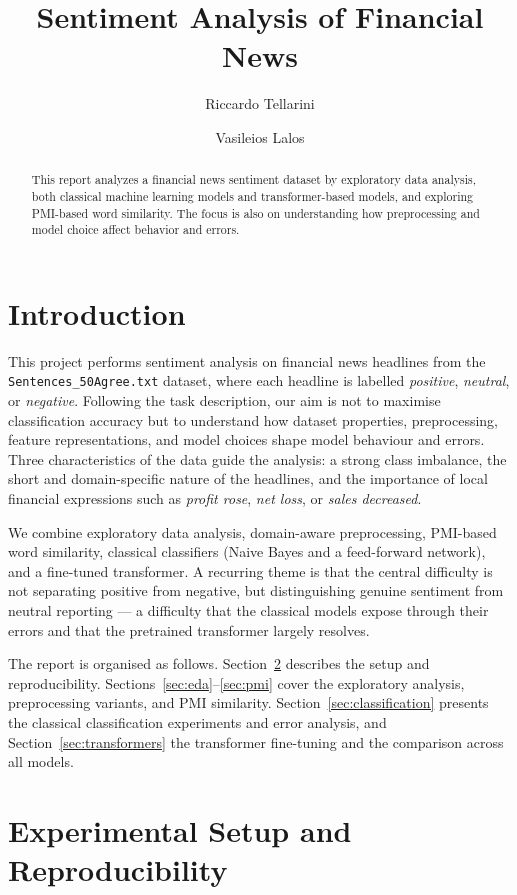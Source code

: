 \documentclass[sigconf,nonacm]{acmart}
\title{Sentiment Analysis of Financial News}
\author{Riccardo Tellarini}
\author{Vasileios Lalos}
\begin{document}
\begin{abstract}
This report analyzes a financial news sentiment dataset by exploratory data analysis, both classical machine learning models and transformer-based models, and exploring PMI-based word similarity.
The focus is also on understanding how preprocessing and model choice affect behavior and errors.
\end{abstract}

\maketitle


\section{Introduction}

This project performs sentiment analysis on financial news headlines from the \texttt{Sentences\_50Agree.txt} dataset, where each headline is labelled \textit{positive}, \textit{neutral}, or \textit{negative}. Following the task description, our aim is not to maximise classification accuracy but to understand how dataset properties, preprocessing, feature representations, and model choices shape model behaviour and errors. Three characteristics of the data guide the analysis: a strong class imbalance, the short and domain-specific nature of the headlines, and the importance of local financial expressions such as \textit{profit rose}, \textit{net loss}, or \textit{sales decreased}.

We combine exploratory data analysis, domain-aware preprocessing, PMI-based word similarity, classical classifiers (Naive Bayes and a feed-forward network), and a fine-tuned transformer. A recurring theme is that the central difficulty is not separating positive from negative, but distinguishing genuine sentiment from neutral reporting --- a difficulty that the classical models expose through their errors and that the pretrained transformer largely resolves.

The report is organised as follows. Section~\ref{sec:reproducibility} describes the setup and reproducibility. Sections~\ref{sec:eda}--\ref{sec:pmi} cover the exploratory analysis, preprocessing variants, and PMI similarity. Section~\ref{sec:classification} presents the classical classification experiments and error analysis, and Section~\ref{sec:transformers} the transformer fine-tuning and the comparison across all models.

\section{Experimental Setup and Reproducibility}
\label{sec:reproducibility}
\end{document}
